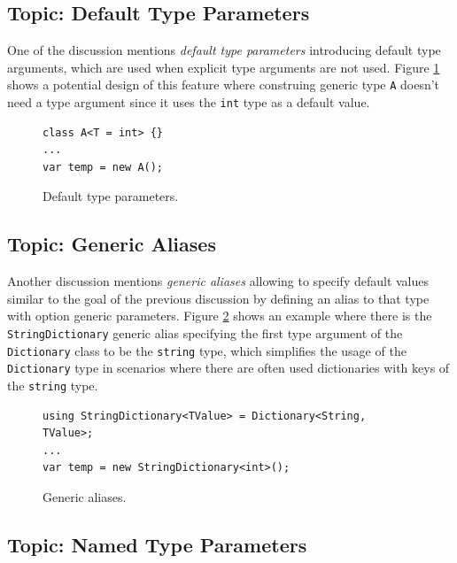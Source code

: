\subsection{Topic: Default Type Parameters} \label{sect07:is1}

One of the discussion \cite{online:DefTypeParam} mentions \textit{default type parameters} introducing default type arguments, which are used when explicit type arguments are not used. 
Figure \ref{img19:defTypeParam} shows a potential design of this feature where construing generic type \texttt{A} doesn’t need a type argument since it uses the \texttt{int} type as a default value. 
\begin{figure}[h]
\begin{lstlisting}[style=csharp]
class A<T = int> {}
...
var temp = new A();
\end{lstlisting}
\caption{Default type parameters.}
\label{img19:defTypeParam}
\end{figure}

\subsection{Topic: Generic Aliases} \label{sect08:is2}

Another discussion \cite{online:GenAlias} mentions \textit{generic aliases} allowing to specify default values similar to the goal of the previous discussion by defining an alias to that type with option generic parameters. 
Figure \ref{img20:genAlias} shows an example where there is the \texttt{StringDictionary} generic alias specifying the first type argument of the \texttt{Dictionary} class to be the \texttt{string} type, which simplifies the usage of the \texttt{Dictionary} type in scenarios where there are often used dictionaries with keys of the \texttt{string} type.
\begin{figure}[h]
\begin{lstlisting}[style=csharp]
using StringDictionary<TValue> = Dictionary<String, TValue>;
...
var temp = new StringDictionary<int>();
\end{lstlisting}
\caption{Generic aliases.}
\label{img20:genAlias}
\end{figure}

\subsection{Topic: Named Type Parameters} \label{sect09:is3}

